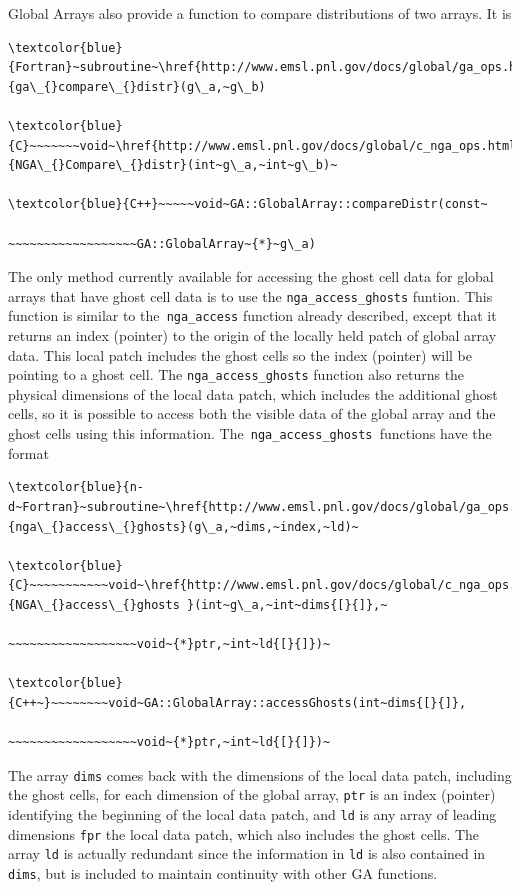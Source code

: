 Global Arrays also provide a function to compare distributions of
two arrays. It is
\begin{verbatim}
\textcolor{blue}{Fortran}~subroutine~\href{http://www.emsl.pnl.gov/docs/global/ga_ops.html\#ga_compare_distr}{ga\_{}compare\_{}distr}(g\_a,~g\_b)

\textcolor{blue}{C}~~~~~~~void~\href{http://www.emsl.pnl.gov/docs/global/c_nga_ops.html\#ga_compare_distr}{NGA\_{}Compare\_{}distr}(int~g\_a,~int~g\_b)~

\textcolor{blue}{C++}~~~~~void~GA::GlobalArray::compareDistr(const~

~~~~~~~~~~~~~~~~~~GA::GlobalArray~{*}~g\_a)
\end{verbatim}
The only method currently available for accessing the ghost cell data
for global arrays that have ghost cell data is to use the \texttt{nga\_access\_ghosts}
funtion. This function is similar to the\texttt{ nga\_access} function
already described, except that it returns an index (pointer) to the
origin of the locally held patch of global array data. This local
patch includes the ghost cells so the index (pointer) will be pointing
to a ghost cell. The \texttt{nga\_access\_ghosts} function also returns
the physical dimensions of the local data patch, which includes the
additional ghost cells, so it is possible to access both the visible
data of the global array and the ghost cells using this information.
The\texttt{ nga\_access\_ghosts }functions have the format
\begin{verbatim}
\textcolor{blue}{n-d~Fortran}~subroutine~\href{http://www.emsl.pnl.gov/docs/global/ga_ops.html\#ga_access_ghosts}{nga\_{}access\_{}ghosts}(g\_a,~dims,~index,~ld)~

\textcolor{blue}{C}~~~~~~~~~~~void~\href{http://www.emsl.pnl.gov/docs/global/c_nga_ops.html\#nga_access_ghosts}{NGA\_{}access\_{}ghosts }(int~g\_a,~int~dims{[}{]},~

~~~~~~~~~~~~~~~~~~void~{*}ptr,~int~ld{[}{]})~

\textcolor{blue}{C++~}~~~~~~~~void~GA::GlobalArray::accessGhosts(int~dims{[}{]},

~~~~~~~~~~~~~~~~~~void~{*}ptr,~int~ld{[}{]})~
\end{verbatim}
The array \texttt{dims} comes back with the dimensions of the local
data patch, including the ghost cells, for each dimension of the global
array, \texttt{ptr} is an index (pointer) identifying the beginning
of the local data patch, and \texttt{ld} is any array of leading dimensions
\texttt{fpr} the local data patch, which also includes the ghost cells.
The array \texttt{ld} is actually redundant since the information
in \texttt{ld} is also contained in \texttt{dims}, but is included
to maintain continuity with other GA functions.


